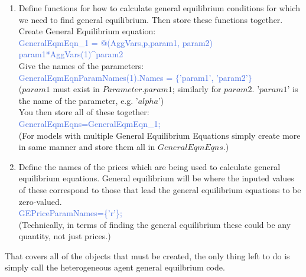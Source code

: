\begin{enumerate}
   Define the names of any parameters used to evaluate the aggregate variables. \\
   \textcolor{RoyalBlue}{FnsToEvaluateParamNames(1).Names=\{\};} \\
   (In our example there were none, but an example might be that you want to evaluate tax revenue, which is a tax rate parameter times an endogenous state variable, then the tax rate
    parameter name will be given here.) \\
   You then store all of these together: \\
   \textcolor{RoyalBlue}{FnsToEvaluate=\{FnsToEvaluate\_{}1\};}
   (For models with multiple FnsToEvaluate simply create more in same manner and store them all in $FnsToEvaluate$.)
 \item Define functions for how to calculate general equilibrium conditions for which we need to find general equilibrium. Then store these
    functions together. \\
    Create General Equilibrium equation: \\
    \textcolor{RoyalBlue}{GeneralEqmEqn\_{}1 = @(AggVars,p,param1, param2) param1*AggVars(1)\^{}param2} \\
    Give the names of the parameters: \\
    \textcolor{RoyalBlue}{GeneralEqmEqnParamNames(1).Names = $\{$'param1', 'param2'$\}$} \\
    ($param1$ must exist in $Parameter.param1$; similarly for $param2$. '$param1$' is the name of the parameter, e.g. '$alpha$') \\
    You then store all of these together: \\
    \textcolor{RoyalBlue}{GeneralEqmEqns={GeneralEqmEqn\_{}1};} \\
    (For models with multiple General Equilibrium Equations simply create more in same manner and store them all in $GeneralEqmEqns$.)
 \item Define the names of the prices which are being used to calculate general equilibrium equations. General equilibrium will be where the inputed
   values of these correspond to those that lead the general equilibrium equations to be zero-valued. \\
   \textcolor{RoyalBlue}{GEPriceParamNames=\{'r'\};} \\
   (Technically, in terms of finding the general equilibrium these could be any quantity, not just prices.)
\end{enumerate}
That covers all of the objects that must be created, the only thing left to do is simply call the heterogeneous agent general equilbrium code. \\
